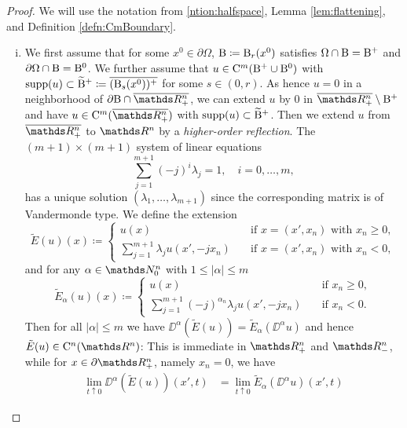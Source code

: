 \begin{proof}
  We will use the notation from \ref{ntion:halfspace}, Lemma \ref{lem:flattening}, and Definition \ref{defn:CmBoundary}.
  \begin{enumerate}[i)]
    \item We first assume that for some $x^0 \in \partial \Omega$, $\mathrm{B} \coloneqq \mathrm{B}_r(x^0)$ satisfies $\Omega \cap \mathrm{B} = \mathrm{B}^+$ and $\partial\Omega \cap \mathrm{B} = \mathrm{B}^0$.
      We further assume that $u \in \mathrm{C}^m(\mathrm{B}^+ \cup \mathrm{B}^0)$ with $\operatorname{supp}(u) \subset \widetilde {\mathrm{B}}^+ \coloneqq \overline{(\mathrm{B}_s(x^0))^+}$ for some $s \in (0,r)$.
      As hence $u = 0$ in a neighborhood of $\partial\BB \cap \overline{\R^n_+}$, we can extend $u$ by $0$ in $\overline{\R^n_+} \setminus \BB^+$ and have $u \in \CC^m(\overline{\R^n_+})$ with $\operatorname{supp}(u) \subset \widetilde {\mathrm{B}}^+$.
      Then we extend $u$ from $\overline{\R^n_+}$ to $\R^n$ by a \emph{higher-order reflection}.
      The $(m + 1)\times(m+1)$ system of linear equations
      \begin{equation}
        \label{eq:sle}
        \sum_{j = 1}^{m + 1} (-j)^i \lambda_j = 1, \quad i = 0,\dots,m,
      \end{equation}
      has a unique solution $(\lambda_1,\dots,\lambda_{m + 1})$ since the corresponding matrix is of Vandermonde type.
      We define the extension
      $$
      \tilde E(u) (x) \coloneqq 
      \begin{cases}
        u(x) &\quad\text{if } x = (x',x_n) \text{ with } x_n \geq 0,\\
        \sum_{j = 1}^{m + 1} \lambda_j u(x',-jx_n) &\quad\text{if } x = (x', x_n) \text{ with } x_n < 0,
      \end{cases}
      $$
      and for any $\alpha \in \N_0^n$ with $1 \leq |\alpha| \leq m$
      $$
      \tilde E_\alpha (u) (x) \coloneqq
      \begin{cases}
        u(x) &\quad\text{if } x_n \geq 0,\\
        \sum_{j = 1}^{m + 1} (-j)^{\alpha_n}\lambda_j u(x',-jx_n) &\quad\text{if } x_n < 0.
      \end{cases}
      $$
      Then for all $|\alpha| \leq m$ we have $\DD^\alpha(\tilde E(u)) = \tilde E_\alpha(\DD^\alpha u)$ and hence $\tilde E (u) \in \CC^n(\R^n)$:
      This is immediate in $\R^n_+$ and $\R^n_-$, while for $x \in \partial \R^n_+$, namely $x_n = 0$, we have
      \begin{align*}
        \lim_{t \uparrow 0 } \DD^\alpha(\tilde E(u))(x',t)
        &= \lim_{t \uparrow 0} \tilde E_\alpha(\DD^\alpha u)(x', t)

\end{align*}
\end{enumerate}
\end{proof}
